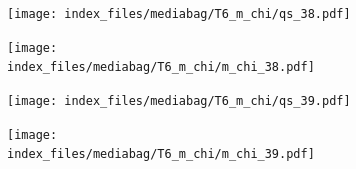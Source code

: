 \documentclass[
  11pt,
  letterpaper,
]{scrreprt}
\begin{document}
\begin{figure}

\begin{minipage}{0.50\linewidth}

\begin{figure}[H]

{\centering \texttt{[image: index\_files/mediabag/T6\_m\_chi/qs\_38.pdf]}

}


\end{figure}%

\end{minipage}%
%
\begin{minipage}{0.50\linewidth}

\begin{figure}[H]

{\centering \texttt{[image: index\_files/mediabag/T6\_m\_chi/m\_chi\_38.pdf]}

}


\end{figure}%

\end{minipage}%

\end{figure}%

\begin{figure}

\begin{minipage}{0.50\linewidth}

\begin{figure}[H]

{\centering \texttt{[image: index\_files/mediabag/T6\_m\_chi/qs\_39.pdf]}

}


\end{figure}%

\end{minipage}%
%
\begin{minipage}{0.50\linewidth}

\begin{figure}[H]

{\centering \texttt{[image: index\_files/mediabag/T6\_m\_chi/m\_chi\_39.pdf]}

}


\end{figure}%

\end{minipage}%

\end{figure}%
\end{document}

